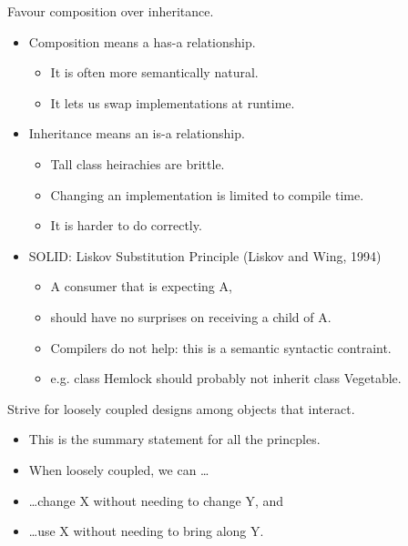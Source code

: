 \documentclass{beamer}
\begin{document}
\begin{frame}{Favour composition over inheritance.}
    \begin{itemize}
        \item Composition means a has-a relationship.
            \begin{itemize}
                \item It is often more semantically natural.
                \item It lets us swap implementations at runtime.
            \end{itemize}
        \item Inheritance means an is-a relationship.
            \begin{itemize}
                \item Tall class heirachies are brittle.
                \item Changing an implementation is limited to compile time.
                \item It is harder to do correctly.
            \end{itemize}
        \item SOLID: Liskov Substitution Principle (Liskov and Wing, 1994)
            \begin{itemize}
                \item A consumer that is expecting A, 
                \item should have no surprises on receiving a child of A.
                \item Compilers do not help: this is a semantic syntactic contraint.
                \item e.g. class Hemlock should probably not inherit class Vegetable.
            \end{itemize}
    \end{itemize}
\end{frame}

\begin{frame}{Strive for loosely coupled designs among objects that interact.}
    \begin{itemize}
        \item This is the summary statement for all the princples.
        \item When loosely coupled, we can \ldots
        \item \ldots change X without needing to change Y, and
        \item \ldots use X without needing to bring along Y.
    \end{itemize}
\end{frame}
\end{document}
